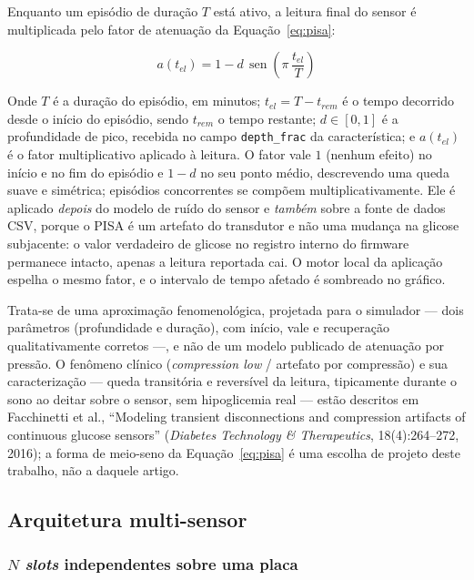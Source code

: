 Enquanto um episódio de duração $T$ está ativo, a leitura final do sensor é
multiplicada pelo fator de atenuação da Equação~\ref{eq:pisa}:

\begin{equation}
a(t_{el}) = 1 - d\,\operatorname{sen}\!\left(\pi\,\frac{t_{el}}{T}\right)
\label{eq:pisa}
\end{equation}

Onde $T$ é a duração do episódio, em minutos; $t_{el} = T - t_{rem}$ é o
tempo decorrido desde o início do episódio, sendo $t_{rem}$ o tempo restante;
$d \in [0,1]$ é a profundidade de pico, recebida no campo \texttt{depth\_frac}
da característica; e $a(t_{el})$ é o fator multiplicativo aplicado à leitura.
O fator vale $1$ (nenhum efeito) no início e no fim do episódio e $1 - d$ no
seu ponto médio, descrevendo uma queda suave e simétrica; episódios
concorrentes se compõem multiplicativamente. Ele é aplicado \emph{depois} do
modelo de ruído do sensor e \emph{também} sobre a fonte de dados CSV, porque
o PISA é um artefato do transdutor e não uma mudança na glicose subjacente:
o valor verdadeiro de glicose no registro interno do firmware permanece
intacto, apenas a leitura reportada cai. O motor local da aplicação espelha o
mesmo fator, e o intervalo de tempo afetado é sombreado no gráfico.

Trata-se de uma aproximação fenomenológica, projetada para o simulador ---
dois parâmetros (profundidade e duração), com início, vale e recuperação
qualitativamente corretos ---, e não de um modelo publicado de atenuação por
pressão. O fenômeno clínico (\textit{compression low} / artefato por
compressão) e sua caracterização --- queda transitória e reversível da
leitura, tipicamente durante o sono ao deitar sobre o sensor, sem hipoglicemia
real --- estão descritos em Facchinetti et al., ``Modeling transient
disconnections and compression artifacts of continuous glucose sensors''
(\textit{Diabetes Technology \& Therapeutics}, 18(4):264--272, 2016); a forma
de meio-seno da Equação~\ref{eq:pisa} é uma escolha de projeto deste trabalho,
não a daquele artigo.

\subsection{Arquitetura multi-sensor}
\label{sec:multi-sensor}

\subsubsection{$N$ \textit{slots} independentes sobre uma placa}
\label{sec:multi-sensor-slots}

